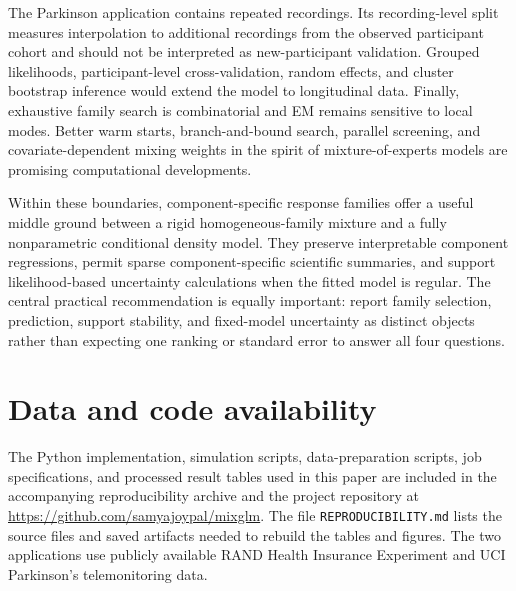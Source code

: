 \documentclass[11pt]{article}
\begin{document}
The Parkinson application contains repeated recordings.  Its recording-level
split measures interpolation to additional recordings from the observed
participant cohort and should not be interpreted as new-participant validation.
Grouped likelihoods, participant-level cross-validation, random effects, and
cluster bootstrap inference would extend the model to longitudinal data.
Finally, exhaustive family search is combinatorial and EM remains sensitive to
local modes.  Better warm starts, branch-and-bound search, parallel screening,
and covariate-dependent mixing weights in the spirit of mixture-of-experts
models are promising computational developments.

Within these boundaries, component-specific response families offer a useful
middle ground between a rigid homogeneous-family mixture and a fully
nonparametric conditional density model.  They preserve interpretable
component regressions, permit sparse component-specific scientific summaries,
and support likelihood-based uncertainty calculations when the fitted model is
regular.  The central practical recommendation is equally important: report
family selection, prediction, support stability, and fixed-model uncertainty as
distinct objects rather than expecting one ranking or standard error to answer
all four questions.

\section*{Data and code availability}

The Python implementation, simulation scripts, data-preparation scripts, job
specifications, and processed result tables used in this paper are included in
the accompanying reproducibility archive and the project repository at
\url{https://github.com/samyajoypal/mixglm}.  The file
\texttt{REPRODUCIBILITY.md} lists the source files and saved artifacts needed
to rebuild the tables and figures.  The two applications use publicly
available RAND Health Insurance Experiment and UCI Parkinson's telemonitoring
data.

\clearpage




\end{document}
